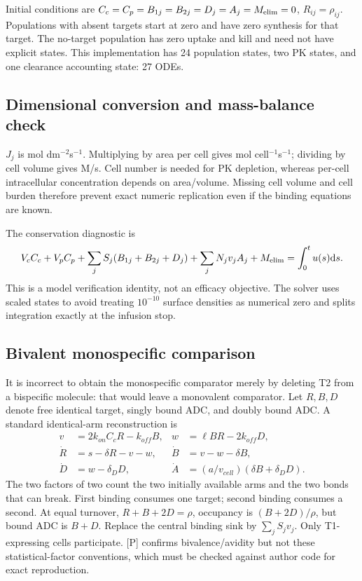 \documentclass[11pt,a4paper]{article}
\begin{document}
Initial conditions are $C_c=C_p=B_{1j}=B_{2j}=D_j=A_j=M_{\rm elim}=0$, $R_{ij}=\rho_{ij}$. Populations with absent targets start at zero and have zero synthesis for that target. The no-target population has zero uptake and kill and need not have explicit states. This implementation has 24 population states, two PK states, and one clearance accounting state: 27 ODEs.

\subsection{Dimensional conversion and mass-balance check}
$J_j$ is mol dm$^{-2}$s$^{-1}$. Multiplying by area per cell gives mol cell$^{-1}$s$^{-1}$; dividing by cell volume gives M/s. Cell number is needed for PK depletion, whereas per-cell intracellular concentration depends on area/volume. Missing cell volume and cell burden therefore prevent exact numeric replication even if the binding equations are known.

The conservation diagnostic is
\begin{equation}
 V_cC_c+V_pC_p+\sum_j S_j(B_{1j}+B_{2j}+D_j)
 +\sum_jN_jv_jA_j+M_{\rm elim}
 =\int_0^t u(s)\mathrm{d} s.
\end{equation}
This is a model verification identity, not an efficacy objective. The solver uses scaled states to avoid treating $10^{-10}$ surface densities as numerical zero and splits integration exactly at the infusion stop.

\subsection{Bivalent monospecific comparison}
It is incorrect to obtain the monospecific comparator merely by deleting T2 from a bispecific molecule: that would leave a monovalent comparator. Let $R,B,D$ denote free identical target, singly bound ADC, and doubly bound ADC. A standard identical-arm reconstruction is
\begin{align}
 v&=2k_{on}C_cR-k_{off}B,&w&=\ell BR-2k_{off}D,\\
 \dot R&=s-\delta R-v-w,&\dot B&=v-w-\delta B,\\
 \dot D&=w-\delta_DD,&\dot A&=(a/v_{cell})(\delta B+\delta_DD).
\end{align}
The two factors of two count the two initially available arms and the two bonds that can break. First binding consumes one target; second binding consumes a second. At equal turnover, $R+B+2D=\rho$, occupancy is $(B+2D)/\rho$, but bound ADC is $B+D$. Replace the central binding sink by $\sum_jS_jv_j$. Only T1-expressing cells participate. [P] confirms bivalence/avidity but not these statistical-factor conventions, which must be checked against author code for exact reproduction.
\end{document}
